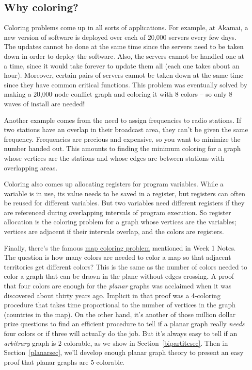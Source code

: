 \subsection{Why coloring?}

Coloring problems come up in all sorts of applications.  For example, at
Akamai, a new version of software is deployed over each of 20,000 servers
every few days.  The updates cannot be done at the same time since the
servers need to be taken down in order to deploy the software.  Also, the
servers cannot be handled one at a time, since it would take forever to
update them all (each one takes about an hour).  Moreover, certain pairs
of servers cannot be taken down at the same time since they have common
critical functions.  This problem was eventually solved by making a 20,000
node conflict graph and coloring it with 8 colors -- so only 8 waves of
install are needed!

Another example comes from the need to assign frequencies to radio
stations.  If two stations have an overlap in their broadcast area, they
can't be given the same frequency.  Frequencies are precious and
expensive, so you want to minimize the number handed out.  This amounts to
finding the minimum coloring for a graph whose vertices are the stations
and whose edges are between stations with overlapping areas.

Coloring also comes up allocating registers for program variables.  While
a variable is in use, its value needs to be saved in a register, but
registers can often be reused for different variables.  But two variables
need different registers if they are referenced during overlapping
intervals of program execution.  So register allocation is the coloring
problem for a graph whose vertices are the variables; vertices are
adjacent if their intervals overlap, and the colors are registers.

Finally, there's the famous
\href{http://courses.csail.mit.edu/6.042/spring09/ln1.pdf#map.color}{map
  coloring problem} mentioned in Week 1 Notes.  The question is how many
colors are needed to color a map so that adjacent territories get
different colors?  This is the same as the number of colors needed to
color a graph that can be drawn in the plane without edges crossing.  A
proof that four colors are enough for the \emph{planar} graphs was
acclaimed when it was discovered about thirty years ago.  Implicit in that
proof was a 4-coloring procedure that takes time proportional to the
number of vertices in the graph (countries in the map).  On the other
hand, it's another of those million dollar prize questions to find an
efficient procedure to tell if a planar graph really \emph{needs} four
colors or if three will actually do the job.  But it's always easy to tell
if an \emph{arbitrary} graph is 2-colorable, as we show in
Section~\ref{bipartitesec}.  Then in Section~\ref{planarsec}, we'll
develop enough planar graph theory to present an easy proof that planar
graphs are 5-colorable.

\endinput